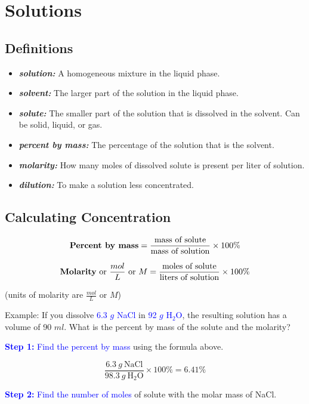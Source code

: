 \documentclass[a4paper, 12pt]{article}
\begin{document}
\section{Solutions}

\subsection*{Definitions}

\begin{itemize}[leftmargin=*, nosep]
    \item \textbf{\textit{solution:}} A homogeneous mixture in the liquid phase.
    \item \textbf{\textit{solvent:}} The larger part of the solution in the liquid phase.
    \item \textbf{\textit{solute:}} The smaller part of the solution that is dissolved in the solvent. Can be solid, liquid, or gas.
    \item \textbf{\textit{percent by mass:}} The percentage of the solution that is the solvent.
    \item \textbf{\textit{molarity:}} How many moles of dissolved solute is present per liter of solution.
    \item \textbf{\textit{dilution:}} To make a solution less concentrated.
\end{itemize}

\subsection*{Calculating Concentration}

$$ \text{\textbf{Percent by mass}} = \frac{\text{mass of solute}}{\text{mass of solution}} \times 100\%$$

$$ \text{\textbf{Molarity} or $\frac{mol}{L}$ or $M$} = \frac{\text{moles of solute}}{\text{liters of solution}} \times 100\%$$

(units of molarity are $\frac{mol}{L}$ or $M$)

Example: If you dissolve \textcolor{blue}{6.3 $g$ NaCl} in \textcolor{blue}{92 $g$ H$_2$O}, the resulting solution has a volume of 90 $ml$. What is the percent by mass of the solute and the molarity?

\textcolor{blue}{\textbf{Step 1:} Find the percent by mass} using the formula above.

$$\frac{6.3 \: g \: \text{NaCl}}{98.3 \: g \: \text{H$_2$O}} \times 100\% = 6.41 \%$$

\textcolor{blue}{\textbf{Step 2:} Find the number of moles} of solute with the molar mass of NaCl.
\end{document}
